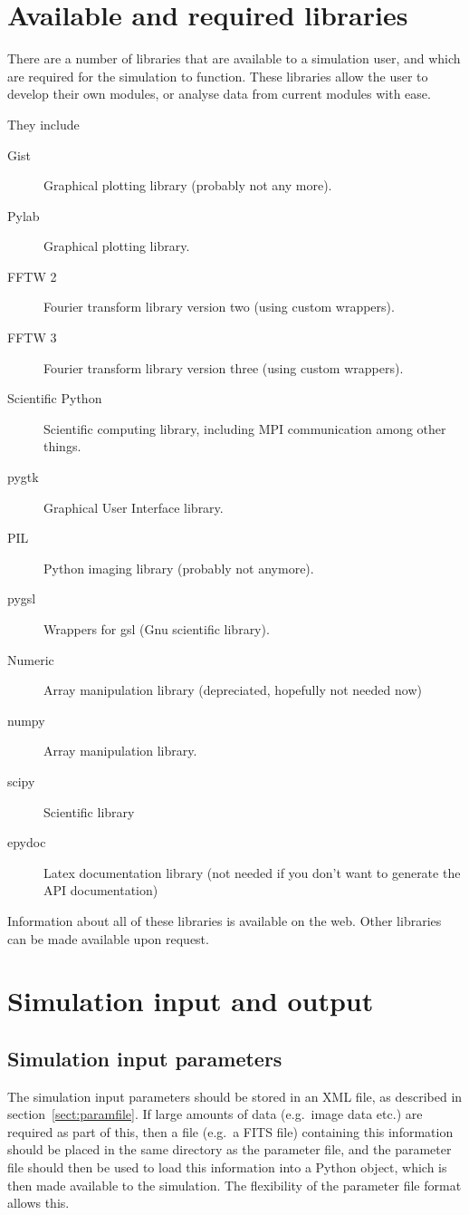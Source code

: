 \documentclass{article}
\begin{document}
\section{Available and required libraries}
There are a number of libraries that are available to a simulation
user, and which are required for the simulation to function.  These
libraries allow the user to develop their own modules, or analyse data
from current modules with ease.

They include
\begin{description}
\item[Gist] Graphical plotting library (probably not any more).
\item[Pylab] Graphical plotting library.
\item[FFTW 2] Fourier transform library version two (using custom wrappers).
\item[FFTW 3] Fourier transform library version three (using custom wrappers).
\item[Scientific Python] Scientific computing library, including MPI
  communication among other things.
\item[pygtk] Graphical User Interface library.
\item[PIL] Python imaging library (probably not anymore).
\item[pygsl] Wrappers for gsl (Gnu scientific library).
\item[Numeric] Array manipulation library (depreciated, hopefully not needed now)
\item[numpy] Array manipulation library.
\item[scipy] Scientific library
\item[epydoc] Latex documentation library (not needed if you don't
  want to generate the API documentation)
\end{description}

Information about all of these libraries is available on the web.
Other libraries can be made available upon request.

\section{Simulation input and output}
\subsection{Simulation input parameters}
The simulation input parameters should be stored in an XML file, as
described in section~\ref{sect:paramfile}.  If large amounts of data
(e.g.\ image data etc.) are required as part of this, then a file
(e.g.\ a FITS file) containing this information should be placed in
the same directory as the parameter file, and the parameter file
should then be used to load this information into a Python object,
which is then made available to the simulation.  The flexibility of
the parameter file format allows this.
\end{document}

